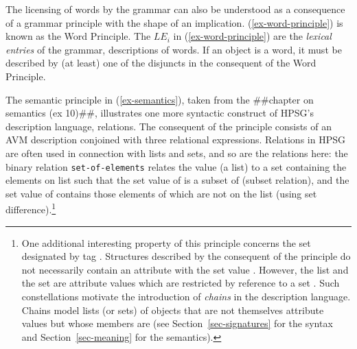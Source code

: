 \documentclass[output=paper
                ,modfonts
                ,nonflat
	        ,collection
	        ,collectionchapter
	        ,collectiontoclongg
 	        ,biblatex
                ,babelshorthands
                ,newtxmath
                ,draftmode
                ,colorlinks, citecolor=brown
]{./langsci/langscibook}
\begin{document}
{{\begin{exe}
\begin{xlist}
\end{xlist}
\end{exe}

The licensing of words by the grammar can also be
understood as a consequence of a grammar principle with the
shape of an implication. (\ref{ex-word-principle}) is known as the
Word Principle. The $LE_{i}$ in (\ref{ex-word-principle}) are the
\emph{lexical entries} of the grammar, descriptions of words.  If an
object is a word, it must be described by (at least) one of the
disjuncts in the consequent of the Word Principle.

The semantic principle in (\ref{ex-semantics}), taken from the
\#\#chapter on semantics (ex 10)\#\#, illustrates one more syntactic
construct of HPSG's description language, relations. The consequent of
the principle consists of an AVM description conjoined with three
relational expressions.  Relations in HPSG are often used in
connection with lists and sets, and so are the relations here: the
binary relation \texttt{set-of-elements} relates the  value
(a list) to a set  containing the elements on list  such
that the set value  of  is a subset of 
(subset relation), and the set value  of 
contains those elements of  which are not on the
 list (using set difference).\footnote{One
  additional interesting property of this principle concerns the set
  designated by tag . Structures described by the consequent of
  the principle do not necessarily contain an attribute with the set
  value . However, the list  and the set  are
  attribute values which are restricted by reference to a set
  . Such constellations motivate the introduction of
  \emph{chains} in the description language. Chains model lists (or
  sets) of objects that are not themselves attribute values but whose
  members are (see Section~\ref{sec-signatures} for the syntax and
  Section~\ref{sec-meaning} for the semantics).}


}}
\end{document}
